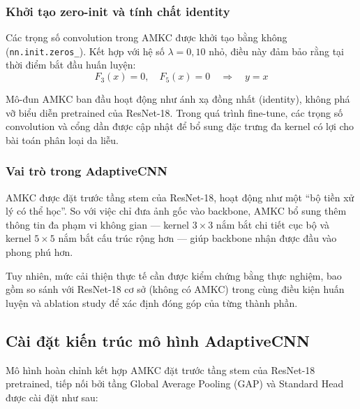 \subsubsection{Khởi tạo zero-init và tính chất identity}

Các trọng số convolution trong AMKC được khởi tạo bằng không (\texttt{nn.init.\allowbreak zeros\_}). Kết hợp với hệ số $\lambda=0{,}10$ nhỏ, điều này đảm bảo rằng tại thời điểm bắt đầu huấn luyện:
\begin{equation}
  F_3(x)=0, \quad F_5(x)=0 \quad \Rightarrow \quad y=x
\end{equation}

Mô-đun AMKC ban đầu hoạt động như ánh xạ đồng nhất (identity), không phá vỡ biểu diễn pretrained của ResNet-18. Trong quá trình fine-tune, các trọng số convolution và cổng dần được cập nhật để bổ sung đặc trưng đa kernel có lợi cho bài toán phân loại da liễu.

\subsubsection{Vai trò trong AdaptiveCNN}

AMKC được đặt trước tầng stem của ResNet-18, hoạt động như một ``bộ tiền xử lý có thể học''. So với việc chỉ đưa ảnh gốc vào backbone, AMKC bổ sung thêm thông tin đa phạm vi không gian --- kernel $3\times3$ nắm bắt chi tiết cục bộ và kernel $5\times5$ nắm bắt cấu trúc rộng hơn --- giúp backbone nhận được đầu vào phong phú hơn.

Tuy nhiên, mức cải thiện thực tế cần được kiểm chứng bằng thực nghiệm, bao gồm so sánh với ResNet-18 cơ sở (không có AMKC) trong cùng điều kiện huấn luyện và ablation study để xác định đóng góp của từng thành phần.

\subsection{Cài đặt kiến trúc mô hình AdaptiveCNN}
Mô hình hoàn chỉnh kết hợp AMKC đặt trước tầng stem của ResNet-18 pretrained, tiếp nối bởi tầng Global Average Pooling (GAP) và Standard Head được cài đặt như sau:

